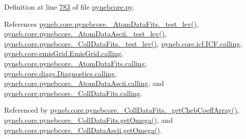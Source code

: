 Definition at line \hyperlink{pynebcore_8py_source_l00783}{783} of file \hyperlink{pynebcore_8py_source}{pynebcore.\+py}.



References \hyperlink{pynebcore_8py_source_l00171}{pyneb.\+core.\+pynebcore.\+\_\+\+Atom\+Data\+Fits.\+\_\+test\+\_\+lev()}, \hyperlink{pynebcore_8py_source_l00435}{pyneb.\+core.\+pynebcore.\+\_\+\+Atom\+Data\+Ascii.\+\_\+test\+\_\+lev()}, \hyperlink{pynebcore_8py_source_l00660}{pyneb.\+core.\+pynebcore.\+\_\+\+Coll\+Data\+Fits.\+\_\+test\+\_\+lev()}, \hyperlink{icf_8py_source_l00016}{pyneb.\+core.\+icf.\+I\+C\+F.\+calling}, \hyperlink{emis_grid_8py_source_l00041}{pyneb.\+core.\+emis\+Grid.\+Emis\+Grid.\+calling}, \hyperlink{pynebcore_8py_source_l00090}{pyneb.\+core.\+pynebcore.\+\_\+\+Atom\+Data\+Fits.\+calling}, \hyperlink{diags_8py_source_l00169}{pyneb.\+core.\+diags.\+Diagnostics.\+calling}, \hyperlink{pynebcore_8py_source_l00311}{pyneb.\+core.\+pynebcore.\+\_\+\+Atom\+Data\+Ascii.\+calling}, and \hyperlink{pynebcore_8py_source_l00568}{pyneb.\+core.\+pynebcore.\+\_\+\+Coll\+Data\+Fits.\+calling}.



Referenced by \hyperlink{pynebcore_8py_source_l00734}{pyneb.\+core.\+pynebcore.\+\_\+\+Coll\+Data\+Fits.\+\_\+get\+Cheb\+Coeff\+Array()}, \hyperlink{pynebcore_8py_source_l00811}{pyneb.\+core.\+pynebcore.\+\_\+\+Coll\+Data\+Fits.\+get\+Omega()}, and \hyperlink{pynebcore_8py_source_l01063}{pyneb.\+core.\+pynebcore.\+\_\+\+Coll\+Data\+Ascii.\+get\+Omega()}.


